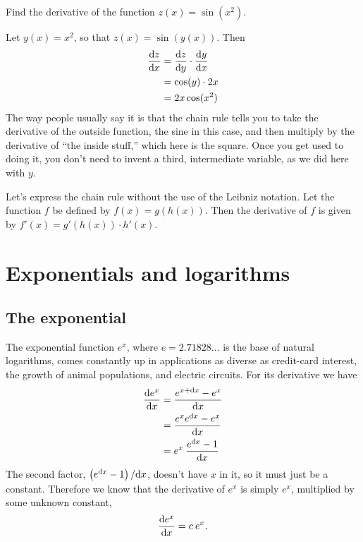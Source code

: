 \begin{eg}
\egquestion Find the derivative of the function $z(x)=\sin(x^2)$.

\eganswer Let $y(x)=x^2$, so that $z(x)=\sin(y(x))$. Then
\begin{align*}
  \frac{\textup{d} z}{\textup{d} x} &= \frac{\textup{d} z}{\textup{d} y} \cdot \frac{\textup{d} y}{\textup{d} x} \\
                        &= \cos(y) \cdot 2x \\
                        &= 2x \cos(x^2)
\end{align*}
The way people usually say it is that the chain rule tells you to take the derivative of
the outside function, the sine in this case, and then multiply by the derivative of
``the inside stuff,'' which here is the square. Once you get used to doing it, you don't
need to invent a third, intermediate variable, as we did here with $y$.
\end{eg}

\begin{eg}\label{eg:chain-rule-without-leibniz}
Let's express the chain rule without the use of the Leibniz notation.
Let the function $f$ be defined by $f(x)=g(h(x))$. Then the derivative
of $f$ is given by $f'(x)=g'(h(x))\cdot h'(x)$.
\end{eg}

\section{Exponentials and logarithms}

\subsection{The exponential}
The exponential function $e^x$, where $e=2.71828\ldots$ is the base of natural
logarithms, comes constantly up in applications as diverse as credit-card interest, the growth of
animal populations, and electric circuits. For its derivative we have
\begin{align*}
  \frac{\textup{d} e^x}{\textup{d} x} &= \frac{e^{x+\textup{d} x}-e^x}{\textup{d} x} \\
                          &= \frac{e^x e^{\textup{d} x}-e^x}{\textup{d} x} \\
                          &= e^x \: \frac{e^{\textup{d} x}-1}{\textup{d} x}
\end{align*}
The second factor, $\left(e^{\textup{d} x}-1\right)/\textup{d} x$, doesn't have $x$ in it, so it
must just be a constant. Therefore we know that the derivative of $e^x$ is simply
$e^x$, multiplied by some unknown constant,
\begin{equation*}
  \frac{\textup{d} e^x}{\textup{d} x} = c\:e^x .
\end{equation*}

